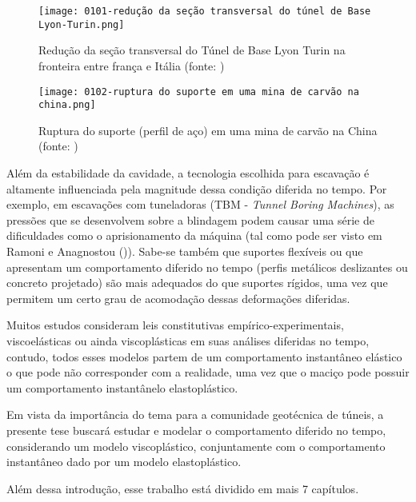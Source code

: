\begin{figure}[H]
	\begin{center}
		\texttt{[image: 0101-redução da seção transversal do túnel de Base Lyon-Turin.png]}
	\end{center}
	\caption{\label{redução_base_turin} Redução da seção transversal do Túnel de Base Lyon Turin na fronteira entre frança e Itália (fonte: )}
\end{figure}

\begin{figure}[H]
	\begin{center}
		\texttt{[image: 0102-ruptura do suporte em uma mina de carvão na china.png]}
	\end{center}
	\caption{\label{redução_base_turin} Ruptura do suporte (perfil de aço) em uma mina de carvão na China (fonte: )}
\end{figure}
 
Além da estabilidade da cavidade, a tecnologia escolhida para escavação é altamente influenciada pela magnitude dessa condição diferida no tempo. Por exemplo, em escavações com tuneladoras (TBM - \textit{Tunnel Boring Machines}), as pressões que se desenvolvem sobre a blindagem podem causar uma série de dificuldades como o aprisionamento da máquina (tal como pode ser visto em Ramoni e Anagnostou (\citeyear{Ramoni2010a,Ramoni2010b})). Sabe-se também que suportes flexíveis ou que apresentam um comportamento diferido no tempo (perfis metálicos deslizantes ou concreto projetado) são mais adequados do que suportes rígidos, uma vez que permitem um certo grau de acomodação dessas deformações diferidas.

Muitos estudos consideram leis constitutivas empírico-experimentais, viscoelásticas ou ainda viscoplásticas em suas análises diferidas no tempo, contudo, todos esses modelos partem de um comportamento instantâneo elástico o que pode não corresponder com a realidade, uma vez que o maciço pode possuir um comportamento instantânelo elastoplástico.

Em vista da importância do tema para a comunidade geotécnica de túneis, a presente tese buscará estudar e modelar o comportamento diferido no tempo, considerando um modelo viscoplástico, conjuntamente com o comportamento instantâneo dado por um modelo elastoplástico. 

Além dessa introdução, esse trabalho está dividido em mais 7 capítulos.

